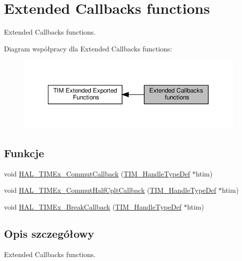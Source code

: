 \hypertarget{group___t_i_m_ex___exported___functions___group6}{}\section{Extended Callbacks functions}
\label{group___t_i_m_ex___exported___functions___group6}


Extended Callbacks functions.  


Diagram współpracy dla Extended Callbacks functions\+:\nopagebreak
\begin{figure}[H]
\begin{center}
\leavevmode
\includegraphics[width=340pt]{group___t_i_m_ex___exported___functions___group6}
\end{center}
\end{figure}
\subsection*{Funkcje}
\begin{DoxyCompactItemize}
\item 
void \hyperlink{group___t_i_m_ex___exported___functions___group6_gaa4189b31d2c006ee33f55f8c6eeba930}{H\+A\+L\+\_\+\+T\+I\+M\+Ex\+\_\+\+Commut\+Callback} (\hyperlink{struct_t_i_m___handle_type_def}{T\+I\+M\+\_\+\+Handle\+Type\+Def} $\ast$htim)
\item 
void \hyperlink{group___t_i_m_ex___exported___functions___group6_ga971ecdc215921771e56ed2c4944dc0b1}{H\+A\+L\+\_\+\+T\+I\+M\+Ex\+\_\+\+Commut\+Half\+Cplt\+Callback} (\hyperlink{struct_t_i_m___handle_type_def}{T\+I\+M\+\_\+\+Handle\+Type\+Def} $\ast$htim)
\item 
void \hyperlink{group___t_i_m_ex___exported___functions___group6_ga2d868a55ca7c62c4a5ef85dec514402c}{H\+A\+L\+\_\+\+T\+I\+M\+Ex\+\_\+\+Break\+Callback} (\hyperlink{struct_t_i_m___handle_type_def}{T\+I\+M\+\_\+\+Handle\+Type\+Def} $\ast$htim)
\end{DoxyCompactItemize}


\subsection{Opis szczegółowy}
Extended Callbacks functions. 



